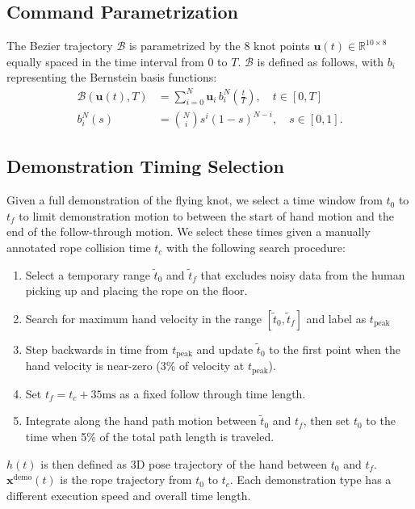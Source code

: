 \documentclass[conference]{IEEEtran}
\newcommand{\command}{\mathbf{u}}
\newcommand{\state}{\mathbf{x}}
\newcommand{\commandt}{\mathbf{u}(t)}
\begin{document}
\subsection{Command Parametrization}
\label{sec:bezier}
The Bezier trajectory $\mathcal{B}$ is parametrized by the 8 knot points $\commandt \in \mathbb{R}^{10\times 8}$ equally spaced in the time interval from 0 to $T$. $\mathcal{B}$ is defined as follows, with $b_i$ representing the Bernstein basis functions:
\begin{align*}
\mathcal{B}(\commandt, T)
&= \sum_{i=0}^{N} \command_i \, b_i^{N}\!\left(\frac{t}{T}\right), \quad t \in [0, T] \\
b_i^{N}(s)
&= \binom{N}{i} s^{i} (1 - s)^{N-i}, \quad s \in [0,1].
\end{align*}

\subsection{Demonstration Timing Selection}
\label{sec:demoselect}
Given a full demonstration of the flying knot, we select a time window from $t_0$ to $t_f$ to limit demonstration motion to between the start of hand motion and the end of the follow-through motion. We select these times given a manually annotated rope collision time $t_c$ with the following search procedure:
\begin{enumerate}
    \item Select a temporary range $\tilde t_0$ and $\tilde t_f$ that excludes noisy data from the human picking up and placing the rope on the floor.
    \item Search for maximum hand velocity in the range $[\tilde t_0, \tilde t_f]$ and label as $t_{\text{peak}}$
    \item Step backwards in time from $t_{\text{peak}}$ and update $\tilde t_0$ to the first point when the hand velocity is near-zero (3\% of velocity at $t_{\text{peak}}$).
    \item Set $t_f=t_c + 35\text{ms}$  as a fixed follow through time length.
    \item Integrate along the hand path motion between $\tilde t_0$ and $t_f$, then set $t_0$ to the time when 5\% of the total path length is traveled.
\end{enumerate}
$h(t)$ is then defined as 3D pose trajectory of the hand between $t_0$ and $t_f$. $\state^{\text{demo}}(t)$ is the rope trajectory from $t_0$ to $t_c$. Each demonstration type has a different execution speed and overall time length. 
\end{document}
